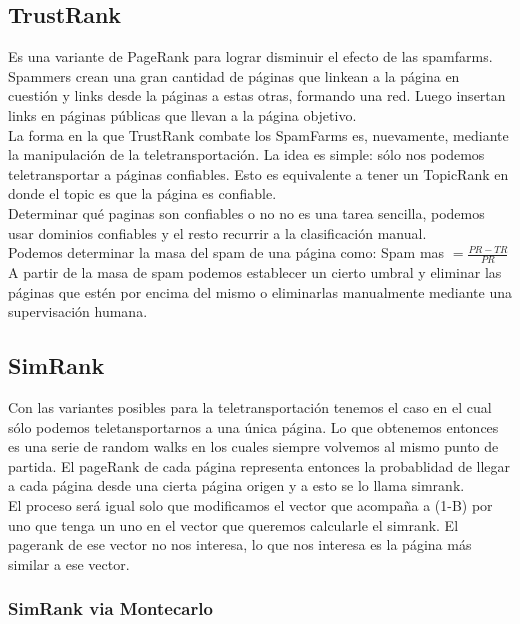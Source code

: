 \documentclass[titlepage,a4paper]{article}
\begin{document}
\subsection*{TrustRank}
Es una variante de PageRank para lograr disminuir el efecto de las spamfarms. Spammers crean una gran cantidad de páginas que linkean a la página en cuestión y links desde la páginas a estas otras, formando una red. Luego insertan links en páginas públicas que llevan a la página objetivo. \\

La forma en la que TrustRank combate los SpamFarms es, nuevamente, mediante la manipulación de la teletransportación. La idea es simple: sólo nos podemos teletransportar a páginas confiables. Esto es equivalente a tener un TopicRank en donde el topic es que la página es confiable. \\

Determinar qué paginas son confiables o no no es una tarea sencilla, podemos usar dominios confiables  y el resto recurrir a la clasificación manual. \\

Podemos determinar la masa del spam de una página como: Spam mas $=\frac{PR-TR}{PR}$\\

A partir de la masa de spam podemos establecer un cierto umbral y eliminar las páginas que estén por encima del mismo o eliminarlas manualmente mediante una supervisación humana. 

\subsection*{SimRank} Con las variantes posibles para la teletransportación tenemos el caso en el cual sólo podemos teletansportarnos a una única página. Lo que obtenemos entonces es una serie de random walks en los cuales siempre volvemos al mismo punto de partida. El pageRank de cada página representa entonces la probablidad de llegar a cada página desde una cierta página origen y a esto se  lo llama simrank. \\

El proceso será igual solo que modificamos el vector que acompaña a (1-B) por uno que tenga un uno en el vector que queremos calcularle el simrank. El pagerank de ese vector no nos interesa, lo que nos interesa es la página más similar a ese vector. 

\subsubsection*{SimRank via Montecarlo}
\end{document}
